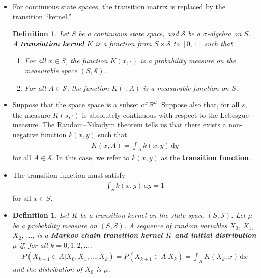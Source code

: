 \documentclass[10pt]{article}
\newtheorem{definition}[lemma]{Definition}
\newcommand{\dee}{\mathrm{d}}
\newcommand{\mcal}[1]{\mathcal{#1}}
\newcommand{\Real}{\mathbb{R}}
\begin{document}
\begin{itemize}
  \item For continuous state spaces, the transition matrix is replaced by the transition ``kernel.''
  
  \begin{definition}
    Let $S$ be a continuous state space, and $\mcal{S}$ be a $\sigma$-algebra on $S$. A {\bf transiation kernel} $K$ is a function from $S \times \mcal{S}$ to $[0,1]$ such that
    \begin{enumerate}
      \item For all $x \in S$, the function $K(x,\cdot)$ is a probability measure on the measurable space $(S, \mcal{S})$.
      \item For all $A \in \mcal{S}$, the function $K(\cdot, A)$ is a measurable function on $S$.
    \end{enumerate}
  \end{definition}

  \item Suppose that the space space is a subset of $\Real^d$. Suppose also that, for all $s$, the measure $K(s,\cdot)$ is absolutely continuous with respect to the Lebesgue measure. The Random--Nikodym theorem tells us that there exists a non-negative function $k(x,y)$ such that
  \begin{align*}
    K(x,A) = \int_A k(x,y)\, \dee y
  \end{align*}
  for all $A \in \mcal{S}$. In this case, we refer to $k(x,y)$ as the {\bf transition function}.

  \item The transition function must satisfy
  \begin{align*}
    \int_S k(x,y)\, \dee y = 1
  \end{align*}
  for all $x \in S$.

  \item \begin{definition}
    Let $K$ be a transition kernel on the state space $(S, \mcal{S})$. Let $\mu$ be a probability measure on $(S, \mcal{S})$. A sequence of random variables $X_0$, $X_1$, $X_2$, $\dotsc$, is a {\bf Markov chain transition kernel $K$ and initial distribution $\mu$} if, for all $k = 0, 1, 2, \dotsc$,
    \begin{align*}
      P(X_{k+1} \in A | X_0, X_1, \dotsc, X_k) = P(X_{k+1} \in A | X_k) = \int_A K(X_k, x)\, \dee x
    \end{align*}
    and the distribution of $X_0$ is $\mu$.
  \end{definition}


\end{itemize}
\end{document}
